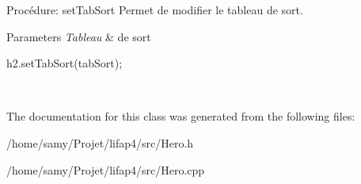 Procédure\+: set\+Tab\+Sort Permet de modifier le tableau de sort. 


\begin{DoxyParams}{Parameters}
{\em Tableau} & de sort 
\begin{DoxyCode}
h2.setTabSort(tabSort);
\end{DoxyCode}
 \\
\hline
\end{DoxyParams}


The documentation for this class was generated from the following files\+:\begin{DoxyCompactItemize}
\item 
/home/samy/\+Projet/lifap4/src/Hero.\+h\item 
/home/samy/\+Projet/lifap4/src/Hero.\+cpp\end{DoxyCompactItemize}
